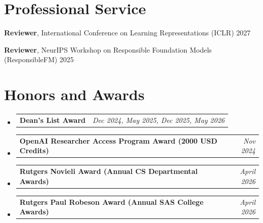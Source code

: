 \documentclass[a4paper,11pt]{article}
\makeatletter
\newcommand{\resumePOR}[3]{
\vspace{0.5mm}\item
    \begin{tabular*}{0.97\textwidth}[t]{l@{\extracolsep{\fill}}r}
        \textbf{#1}\hspace{0.3mm}#2 & \textit{\small{#3}} 
    \end{tabular*}
    \vspace{-2mm}
}
\newcommand{\resumeSubHeadingListStart}{\begin{itemize}[leftmargin=*,labelsep=1mm]}
\newcommand{\resumeSubHeadingListEnd}{\end{itemize}\vspace{2mm}}
\makeatother
\begin{document}
\section{\textbf{Professional Service}}
\vspace{1mm}
\small{
\textbf{Reviewer}, International Conference on Learning Representations (ICLR) \hfill 2027

\textbf{Reviewer}, NeurIPS Workshop on Responsible Foundation Models (ResponsibleFM) \hfill 2025\par
}
\vspace{-2mm}

\section{\textbf{Honors and Awards}}

\resumeSubHeadingListStart
\resumePOR{\textnormal{Dean's List Award}}
    {}
    {Dec 2024, May 2025, Dec 2025, May 2026}

\resumePOR{\textnormal{OpenAI Researcher Access Program Award (2000 USD Credits)}}
    {}
    {Nov 2024}

\resumePOR{\textnormal{Rutgers Novieli Award (Annual CS Departmental Awards)}}
    {}
    {April 2026}

\resumePOR{\textnormal{Rutgers Paul Robeson Award (Annual SAS College  Awards)}}
    {}
    {April 2026}
\resumeSubHeadingListEnd
\vspace{-4mm}
\end{document}
